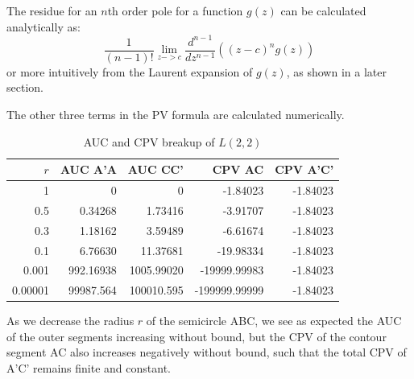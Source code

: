 \documentclass[a4paper,11pt,twoside]{amsart}
\newcommand\PV{\mathrm{PV}}
\begin{document}
The residue for an $n$th order pole for a function $g(z)$ can be calculated analytically as: 
$$\frac{1}{(n-1)!} \lim_{z->c} \frac{d^{n-1}}{dz^{n-1}} ((z-c)^{n} g(z))$$ or more intuitively from the Laurent expansion of $g(z)$, as shown in a later section.

The other three terms in the $\PV$ formula are calculated numerically.

\begin{table}[H]
  \begin{center}
    \begin{tabular}{r|r|r|r|r} %
      $r$ & AUC A'A & AUC CC' & CPV AC & CPV A'C'\\
      \hline
      1 & 0 & 0 & -1.84023 & -1.84023\\
      0.5 & 0.34268 & 1.73416 & -3.91707 & -1.84023\\
      0.3 & 1.18162 & 3.59489 & -6.61674 & -1.84023\\
      0.1 & 6.76630 & 11.37681 & -19.98334 & -1.84023\\
      0.001 & 992.16938 & 1005.99020 & -19999.99983 & -1.84023\\
      0.00001 & 99987.564 & 100010.595 & -199999.99999 & -1.84023\\
    \end{tabular}
    \caption{AUC and CPV breakup of $L(2,2)$}
  \end{center}
\end{table}
\vspace{-2em}
As we decrease the radius $r$ of the semicircle ABC, we see as expected the AUC of the outer segments increasing without bound, but the CPV of the contour segment AC also increases negatively without bound, such that the total CPV of A'C' remains finite and constant.
\end{document}
